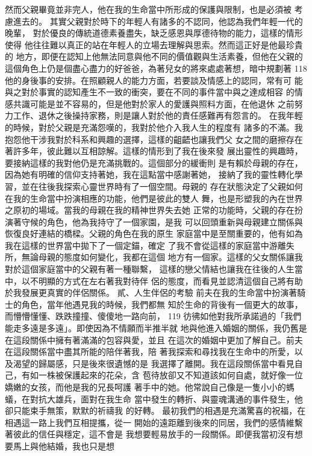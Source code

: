 然而父親畢竟並非完人，他在我的生命當中所形成的保護與限制，也是必須被
考慮進去的。 
其實父親對於時下的年輕人有諸多的不認同，他認為我們年輕一代的晚輩，
對於優良的傳統道德素養盡失，缺乏感恩與厚德待物的能力，這樣的情形使得
他往往難以真正的站在年輕人的立場去理解與思索。然而這正好是他最珍貴的
地方，即便在認知上他無法同意與他不同的價值觀與生活素養，但他在父親的
這個角色上仍是個盡心盡力的好爸爸，為著兒女的將來處處著想，暗中規劃著
118 
他的身後事的安排。在照顧親人的能力方面，若要談及情感上的認同，常有可
能與之對於事實的認知產生不一致的衝突，要在不同的事件當中與之達成相容
的情感共識可能是並不容易的，但是他對於家人的愛護與照料方面，在他退休
之前努力工作、退休之後操持家務，則是讓人對於他的責任感難再有怨言的。 
在我年輕的時候，對於父親是充滿怨嘆的，我對於他介入我人生的程度有
諸多的不滿。我抱怨他干涉我對於科系和興趣的選擇，這樣的齟齬也讓我們父
女之間的磨擦存在著許多年，彼此難以互相諒解。這樣的情形到了我在後來發
展出靈性的興趣時，要接納這樣的我對他仍是充滿挑戰的。這個部分的緩衝則
是有賴於母親的存在，因為她有明確的信仰支持著她，我在這點當中感謝著她，
接納了我的靈性轉化學習，並在往後我探索心靈世界時有了一個空間。母親的
存在狀態決定了父親如何在我的生命當中扮演相應的功能，他們是彼此的雙人
舞，也是形塑我的內在世界之原初的場域。當我的母親在我的精神世界失去她
正常的功能時，父親的存在扮演著守候的角色，他為我持守了一個家園，是我
可以回頭重新與母親建立關係與恢復良好連結的橋樑。父親的角色在我的原生
家庭當中是至關重要的，他有如為我在這樣的世界當中拋下了一個定錨，確定
了我不會從這樣的家庭當中游離失所，無論母親的態度如何變化，我都在這個
地方有一個家。這樣的父女關係讓我對於這個家庭當中的父親有著一種聯繫，
這樣的戀父情結也讓我在往後的人生當中，以不明顯的方式在左右著我對待伴
侶的態度，而看見並認清這個自己將有助於我發展更真實的伴侶關係。 
貳、人生伴侶的考驗 
前夫在我的生命當中扮演著騎士的角色，當年他遇見我的時候，我們都無
知於生命的背後有一個更大的故事，而懵懵懂懂、跌跌撞撞、傻傻地一路向前，
119 
彷彿如他對我所承諾過的「我們能走多遠是多遠」。即使因為不情願而半推半就
地與他進入婚姻的關係，我仍舊是在這段關係中擁有著滿滿的包容與愛，並且
在這次的婚姻中更加了解自己。前夫在這段關係當中盡其所能的陪伴著我，陪
著我探索和尋找我在生命中的所愛，以及渴望的歸屬感，只是後來很遺憾的是
我選擇了離開。我在這段關係當中看見自己，有如一株被保護起來的花朵，含
苞待放卻又不知道該如何自處，就好像一位嬌嫩的女孩，而他是我的兄長呵護
著手中的她。他常說自己像是一隻小小的螞蟻，在對抗大雄兵，面對在我生命
當中發生的轉折、與靈魂溝通的事件發生，他卻只能束手無策，默默的祈禱我
的好轉。 
最初我們的相遇是充滿驚喜的祝福，在相遇這一路上我們互相提攜，從一
開始的遠距離到後來的同居，我們的感情維繫著彼此的信任與穩定，這不會是
我想要輕易放手的一段關係。即便我當初沒有想要馬上與他結婚，我也只是想
